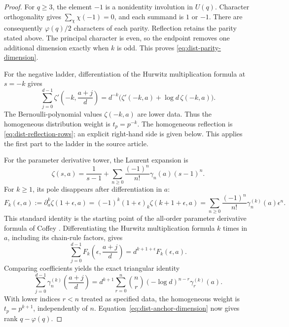 \begin{proof}
For \(q\geq3\), the element \(-1\) is a nonidentity involution in
\(U(q)\). Character orthogonality gives
\(\sum_\chi\chi(-1)=0\), and each summand is \(1\) or \(-1\).
There are consequently \(\varphi(q)/2\) characters of each parity.
Reflection retains the parity stated above. The principal
character is even, so the endpoint removes one additional
dimension exactly when \(k\) is odd. This proves
\eqref{eq:dist-parity-dimension}.

For the negative ladder, differentiation of the Hurwitz
multiplication formula at \(s=-k\) gives
\begin{equation}
 \sum_{j=0}^{d-1}
 \zeta'\!\left(-k,\frac{a+j}{d}\right)
 =d^{-k}\bigl(\zeta'(-k,a)+\log d\,\zeta(-k,a)\bigr).
 \label{eq:dist-negative-jet}
\end{equation}
The Bernoulli-polynomial values \(\zeta(-k,a)\) are lower data.
Thus the homogeneous distribution weight is \(t_p=p^{-k}\).
The homogeneous reflection is
\eqref{eq:dist-reflection-rows}; an explicit right-hand side is
given below. This applies the first part to the ladder in the
source article.

For the parameter derivative tower, the Laurent expansion is
\begin{equation}
 \zeta(s,a)=\frac1{s-1}
   +\sum_{n\geq0}\frac{(-1)^n}{n!}\gamma_n(a)(s-1)^n.
 \label{eq:dist-stieltjes-laurent}
\end{equation}
For \(k\geq1\), its pole disappears after differentiation in \(a\):
\begin{equation}
 F_k(\epsilon,a):=
 \partial_a^k\zeta(1+\epsilon,a)
 =(-1)^k(1+\epsilon)_k\zeta(k+1+\epsilon,a)
 =\sum_{n\geq0}\frac{(-1)^n}{n!}
          \gamma_n^{(k)}(a)\epsilon^n.
 \label{eq:dist-stieltjes-generating}
\end{equation}
This standard identity is the starting point of the all-order
parameter derivative formula of Coffey \cite{Coffey}.
Differentiating the Hurwitz multiplication formula \(k\) times
in \(a\), including its chain-rule factors, gives
\[
 \sum_{j=0}^{d-1}
 F_k\!\left(\epsilon,\frac{a+j}{d}\right)
 =d^{k+1+\epsilon}F_k(\epsilon,a).
\]
Comparing coefficients yields the exact triangular identity
\begin{equation}
 \sum_{j=0}^{d-1}
 \gamma_n^{(k)}\!\left(\frac{a+j}{d}\right)
 =d^{k+1}\sum_{r=0}^{n}
   \binom nr(-\log d)^{n-r}\gamma_r^{(k)}(a).
 \label{eq:dist-stieltjes-multiplication}
\end{equation}
With lower indices \(r<n\) treated as specified data, the
homogeneous weight is \(t_p=p^{k+1}\), independently of \(n\).
Equation~\eqref{eq:dist-anchor-dimension} now gives rank
\(q-\varphi(q)\).
\end{proof}

